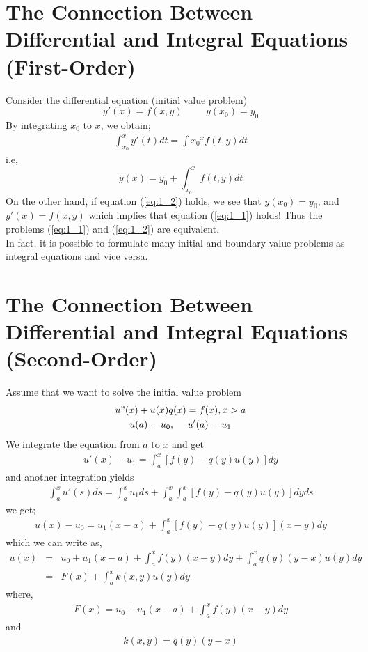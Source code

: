 \documentclass[11pt]{report}
\newcommand{\sps}{\\[0.2cm]}
\newcommand{\refn}[1]{(\ref{#1})}
\newcommand{\refx}[1]{\refn{eq:#1}}
\newcommand{\NI}{\noindent}
\begin{document}
	\section{The Connection Between Differential and Integral Equations (First-Order)}
	Consider the differential equation (initial value problem)
	\begin{equation}
		y'(x) = f(x,y)\hspace{1cm} y(x_0) = y_0\label{eq:1_1}
	\end{equation}
	By integrating $x_0$ to  $x$, we obtain;
	\begin{eqnarray*}
		\int_{x_0}^{x} y'(t)dt = \int{x_0}^{x} f(t,y)dt
	\end{eqnarray*}
	i.e,
	\begin{equation}
		y(x) = y_0 + \int_{x_0}^{x} f(t,y)dt\label{eq:1_2}
	\end{equation}
	On the other hand, if equation \refx{1_2} holds, we see that $y(x_0) = y_0$, and $y'(x) = f(x,y)$ which implies that equation \refx{1_1} holds! Thus the problems \refx{1_1} and \refx{1_2} are equivalent.\\
	
	\NI In fact, it is possible to formulate many initial and boundary value problems as integral equations and vice versa.
	
	\section{The Connection Between Differential and Integral Equations (Second-Order)}
	Assume that we want to solve the initial value problem
	\begin{gather}
		u"(x) + u(x)q(x) = f(x), x>a\\
		u(a) = u_0,~~~~ u'(a) = u_1\notag
	\end{gather}
	We integrate the equation from $a$ to $x$ and get
	\begin{eqnarray*}
		u'(x) - u_1 = \int_{a}^{x} [f(y) - q(y)u(y)]dy\label{eq:1_3}
	\end{eqnarray*}
	and another integration yields
	\begin{eqnarray*}
		\int_{a}^{x} u'(s)ds = \int_{a}^{x} u_1ds + \int_{a}^{x}\int_{a}^{x} [f(y) - q(y)u(y)]dyds
	\end{eqnarray*}
	we get;
	\begin{eqnarray*}
		u(x) - u_0 = u_1(x-a) + \int_{a}^{x} [f(y) - q(y)u(y)](x - y)dy
	\end{eqnarray*}
	which we can write as,
	\begin{eqnarray*}
		u(x) &=& u_0 + u_1(x-a) + \int_{a}^{x} f(y)(x - y)dy + \int_{a}^{x} q(y)(y - x)u(y)dy\sps
		&=& F(x) + \int_{a}^{x} k(x,y)u(y)dy
	\end{eqnarray*}
	where,
	\begin{eqnarray*}
		F(x) = u_0 + u_1(x - a) + \int_{a}^{x} f(y)(x - y)dy
	\end{eqnarray*}
	and
	\begin{eqnarray*}
			k(x,y) = q(y)(y - x)
	\end{eqnarray*}
	
\end{document}
